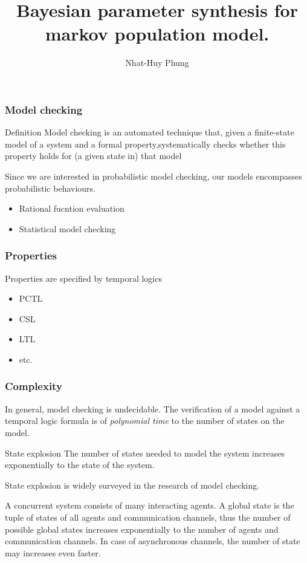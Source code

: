 \documentclass{beamer}
\title{Bayesian parameter synthesis for markov population model.}
\author{Nhat-Huy Phung}
\institute{University of Konstanz}
\begin{document}
\frame{\titlepage}

\begin{frame}
    \frametitle{Model checking}
    \begin{block}{Definition}
        Model checking is an automated technique that, given a finite-state model of a system and a formal property,systematically checks whether this property holds for (a given state in) that model
    \end{block}
    Since we are interested in probabilistic model checking, our models encompasses probabilistic behaviours.
    \begin{examples}
        \begin{itemize}
            \item Rational fucntion evaluation
            \item Statistical model checking
        \end{itemize}
    \end{examples}
\end{frame}


\begin{frame}
    \frametitle{Properties}
    Properties are specified by temporal logics
    \begin{examples}
        \begin{itemize}
            \item PCTL
            \item CSL
            \item LTL
            \item etc.
        \end{itemize}
    \end{examples}
\end{frame}

\begin{frame}
    \frametitle{Complexity}
    In general, model checking is undecidable. The verification of a model against a temporal logic formula is of \textit{polynomial time} to the number of states on the model.
    \begin{block}{State explosion}
        The number of states needed to model the system increases exponentially to the state of the system.
    \end{block}
    State explosion is widely surveyed in the research of model checking. \cite{clarke2011model}
\end{frame}

\begin{frame}
    \begin{examples}
        A concurrent system consists of many interacting agents. A global state is the tuple of states of all agents and communication channels, thus the number of possible global states increases exponentially to the number of agents and communication channels. In case of asynchronous channels, the number of state may increases even faster.
    \end{examples}
\end{frame}
\end{document}
